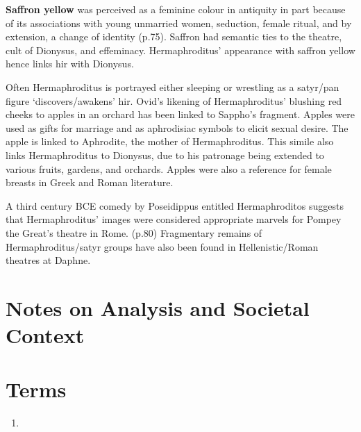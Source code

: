\textbf{Saffron yellow} was perceived as a feminine colour in antiquity in part because of its associations with young unmarried women, seduction, female ritual, and by extension, a change of identity (p.75). Saffron had semantic ties to the theatre, cult of Dionysus, and effeminacy. Hermaphroditus' appearance with saffron yellow hence links hir with Dionysus.

Often Hermaphroditus is portrayed either sleeping or wrestling as a satyr/pan figure `discovers/awakens' hir. Ovid's likening of Hermaphroditus' blushing red cheeks to apples in an orchard has been linked to Sappho's fragment. Apples were used as gifts for marriage and as aphrodisiac symbols to elicit sexual desire. The apple is linked to Aphrodite, the mother of Hermaphroditus. This simile also links Hermaphroditus to Dionysus, due to his patronage being extended to various fruits, gardens, and orchards. Apples were also a reference for female breasts in Greek and Roman literature.

A third century BCE comedy by Poseidippus entitled Hermaphroditos suggests that Hermaphroditus' images were considered appropriate marvels for Pompey the Great's theatre in Rome. (p.80) Fragmentary remains of Hermaphroditus/satyr groups have also been found in Hellenistic/Roman theatres at Daphne.



\section{Notes on Analysis and Societal Context}
\label{sec:SocContHerm}



\section{Terms}
\label{sec:termsHerm}

\begin{enumerate}
	\item
\end{enumerate}

%
%
%


